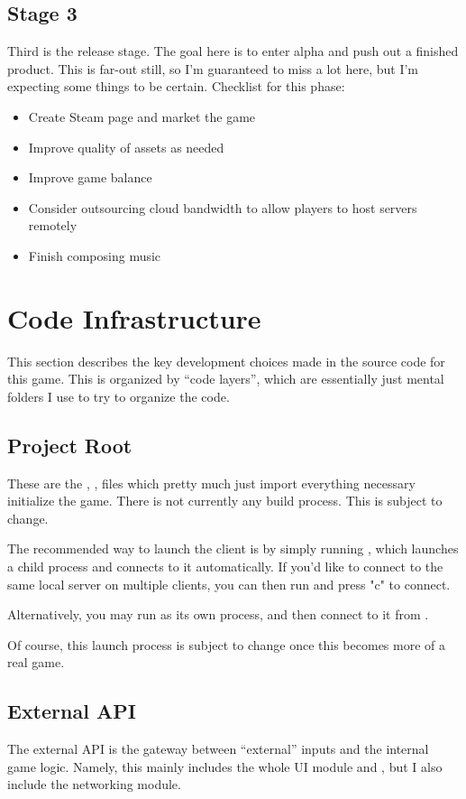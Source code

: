 \documentclass{article}
\begin{document}
\subsection{Stage 3}
Third is the release stage. The goal here is to enter alpha and push out a finished product.
This is far-out still, so I'm guaranteed to miss a lot here, but I'm expecting some things to
be certain.
Checklist for this phase:
\begin{itemize}
    \item Create Steam page and market the game
    \item Improve quality of assets as needed
    \item Improve game balance
    \item Consider outsourcing cloud bandwidth to allow players to host servers remotely
    \item Finish composing music
\end{itemize}

\section{Code Infrastructure}
This section describes the key development choices made in the source code
for this game.  This is organized by ``code layers'', which are essentially just
mental folders I use to try to organize the code.

\subsection{Project Root}
These are the , , 
files which pretty much just import everything necessary initialize the game. 
There is not currently any build process. This is subject to change.

The recommended way to launch the client is by simply running , which
launches a child  process and connects to it automatically.
If you'd like to connect to the same local server on multiple clients, you can then run
 and press "c" to connect.

Alternatively, you may run  as its own process, and then connect
to it from .

Of course, this launch process is subject to change once this becomes more of a real game.

\subsection{External API}
The external API is the gateway between ``external'' inputs and the internal game logic.
Namely, this mainly includes the whole UI module and , but I
also include the networking module.
\end{document}
